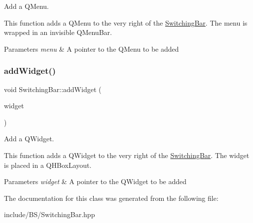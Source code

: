 Add a Q\+Menu. 

This function adds a Q\+Menu to the very right of the \hyperlink{class_switching_bar}{Switching\+Bar}. The menu is wrapped in an invisible Q\+Menu\+Bar. 
\begin{DoxyParams}{Parameters}
{\em menu} & A pointer to the Q\+Menu to be added \\
\hline
\end{DoxyParams}
\hypertarget{class_switching_bar_a8e30709aa4ada4364acf8b755f8eefb6}{}\label{class_switching_bar_a8e30709aa4ada4364acf8b755f8eefb6} 
\subsubsection{\texorpdfstring{add\+Widget()}{addWidget()}}
{\footnotesize\ttfamily void Switching\+Bar\+::add\+Widget (\begin{DoxyParamCaption}\item[{Q\+Widget $\ast$}]{widget }\end{DoxyParamCaption})}



Add a Q\+Widget. 

This function adds a Q\+Widget to the very right of the \hyperlink{class_switching_bar}{Switching\+Bar}. The widget is placed in a Q\+H\+Box\+Layout. 
\begin{DoxyParams}{Parameters}
{\em widget} & A pointer to the Q\+Widget to be added \\
\hline
\end{DoxyParams}


The documentation for this class was generated from the following file\+:\begin{DoxyCompactItemize}
\item 
include/\+B\+S/Switching\+Bar.\+hpp\end{DoxyCompactItemize}
